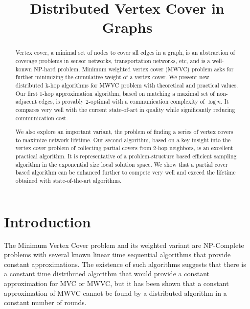 

\title{Distributed Vertex Cover in Graphs} 

\author{
}

\maketitle

\begin{abstract}
 Vertex cover, a minimal set of nodes to cover all edges in a graph, is an abstraction of coverage problems in sensor networks, transportation networks, etc, and is a well-konwn NP-hard problem.  Minimum weighted vertex cover (MWVC) problem asks for further minimizing the cumulative weight of a vertex cover.  We present new distributed k-hop algorithms for MWVC problem with theoretical and practical values.  Our first 1-hop approximation algorithm, based on matching a maximal set of non-adjacent edges, is provably 2-optimal with a communication complexity of $\log n$.   It compares very well with the current state-of-art in quality while significantly reducing communication cost.

We also explore an important variant, the problem of finding a series of vertex covers to maximize network lifetime.  Our second algorithm, based on a key insight into the vertex cover problem of collecting partial covers from 2-hop neighbors, is an excellent practical algorithm.  It is representative of a problem-structure based efficient sampling algorithm in the exponential size local solution space.   We show that a partial cover based algorithm can be enhanced further to compete very well and exceed the lifetime obtained with state-of-the-art algorithms. 
\end{abstract}
\section{Introduction}
The Minimum Vertex Cover problem and its weighted variant are NP-Complete problems with several known linear time sequential algorithms that provide constant approximations. The existence of such algorithms suggests that there is a constant time distributed algorithm that would provide a constant approximation for MVC or MWVC, but it has been shown that a constant approximation of MWVC cannot be found by a distributed algorithm in a constant number of rounds.\cite{1011811} 

